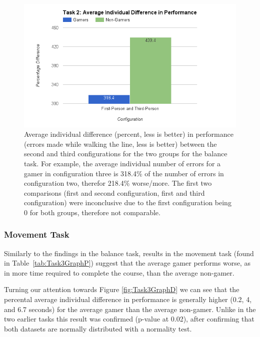 \documentclass[runningheads,a4paper,oribibl]{llncs}
\begin{document}
\begin{figure}
   \centering
   \includegraphics[width=\textwidth]{ExternalMaterial/Task2GraphD}
   \caption{Average individual difference (percent, less is better) in performance (errors made while walking the line, less is better) between the second and third configurations for the two groups for the balance task. For example, the average individual number of errors for a gamer in configuration three is 318.4\% of the number of errors in configuration two, therefor 218.4\% worse/more. The first two comparisons (first and second configuration, first and third configuration) were inconclusive due to the first configuration being 0 for both groups, therefore not comparable.} \label{fig:Task2GraphD}
\end{figure}











\subsubsection{Movement Task}
Similarly to the findings in the balance task, results in the movement task (found in Table~\ref{tab:Task3GraphP}) suggest that the average gamer performs worse, as in more time required to complete the course, than the average non-gamer. 

Turning our attention towards Figure \ref{fig:Task3GraphD} we can see that the percental average individual difference in performance is generally higher (0.2, 4, and 6.7 seconds) for the average gamer than the average non-gamer. Unlike in the two earlier tasks this result was confirmed (p-value at 0.02), after confirming that both datasets are normally distributed with a normality test.
\end{document}
